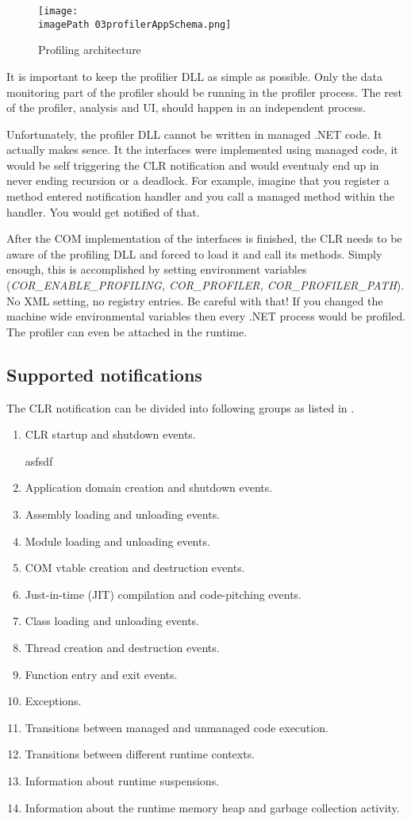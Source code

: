 \begin{figure}
	\centering
		\texttt{[image: \\imagePath 03profilerAppSchema.png]}
		\caption{Profiling architecture \cite{ProfMSDN} }
	\label{fig:03profilerAppSchema}
\end{figure}

It is important to keep the profilier DLL as simple as possible. Only the data monitoring part of the profiler should be running in the profiler process. The rest of the profiler, analysis and UI, should happen in an independent process.

Unfortunately, the profiler DLL cannot be written in managed .NET code. It actually makes sence. It the interfaces were implemented using managed code, it would be self triggering the CLR notification and would eventualy end up in never ending recursion or a deadlock. For example, imagine that you register a method entered notification handler and you call a managed method within the handler. You would get notified of that.

After the COM implementation of the interfaces is finished, the CLR needs to be aware of the profiling DLL and forced to load it and call its methods. Simply enough, this is accomplished by setting
 environment variables (\textit{COR\_ENABLE\_PROFILING, COR\_PROFILER, COR\_PROFILER\_PATH}). No XML setting, no registry entries. Be careful with that! If you changed the machine wide environmental variables then every .NET process would be profiled. The profiler can even be attached in the runtime.

\subsection{Supported notifications}
The CLR notification can be divided into following groups as listed in \cite{ProfMSDN}.

\begin{enumerate}
\item CLR startup and shutdown events.

asfsdf
\item Application domain creation and shutdown events.
\item Assembly loading and unloading events.
\item Module loading and unloading events.
\item COM vtable creation and destruction events.
\item Just-in-time (JIT) compilation and code-pitching events.
\item Class loading and unloading events.
\item Thread creation and destruction events.
\item Function entry and exit events.
\item Exceptions.
\item Transitions between managed and unmanaged code execution.
\item Transitions between different runtime contexts.
\item Information about runtime suspensions.
\item Information about the runtime memory heap and garbage collection activity.
\end{enumerate}

